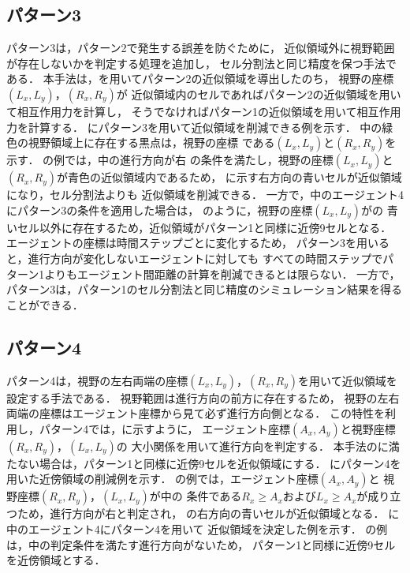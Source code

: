 \subsection{パターン3}
パターン3は，パターン2で発生する誤差を防ぐために，
近似領域外に視野範囲が存在しないかを判定する処理を追加し，
セル分割法と同じ精度を保つ手法である\cite{katayose}．
本手法は，を用いてパターン2の近似領域を導出したのち，
視野の座標$(L_x,L_y)$，$(R_x,R_y)$が
近似領域内のセルであればパターン2の近似領域を用いて相互作用力を計算し，
そうでなければパターン1の近似領域を用いて相互作用力を計算する．
にパターン3を用いて近似領域を削減できる例を示す．
中の緑色の視野領域上に存在する黒点は，視野の座標
である$(L_x,L_y)$と$(R_x,R_y)$を示す．
の例では，中の進行方向が右
の条件を満たし，視野の座標$(L_x,L_y)$と$(R_x,R_y)$が青色の近似領域内であるため，
に示す右方向の青いセルが近似領域になり，セル分割法よりも
近似領域を削減できる．
一方で，中のエージェント4にパターン3の条件を適用した場合は，
のように，視野の座標$(L_x,L_y)$がの
青いセル以外に存在するため，近似領域がパターン1と同様に近傍9セルとなる．
エージェントの座標は時間ステップごとに変化するため，
パターン3を用いると，進行方向が変化しないエージェントに対しても
すべての時間ステップでパターン1よりもエージェント間距離の計算を削減できるとは限らない．
一方で，パターン3は，パターン1のセル分割法と同じ精度のシミュレーション結果を得ることができる．



\subsection{パターン4}
パターン4は，視野の左右両端の座標$(L_x,L_y)$，$(R_x,R_y)$を用いて近似領域を設定する手法である．
視野範囲は進行方向の前方に存在するため，
視野の左右両端の座標はエージェント座標から見て必ず進行方向側となる．
この特性を利用し，パターン4では，に示すように，
エージェント座標$(A_x,A_y)$と視野座標$(R_x,R_y)$，$(L_x,L_y)$の
大小関係を用いて進行方向を判定する．
本手法のに満たない場合は，パターン1と同様に近傍9セルを近似領域にする．
にパターン4を用いた近傍領域の削減例を示す．
の例では，エージェント座標$(A_x,A_y)$と
視野座標$(R_x,R_y)$，$(L_x,L_y)$が中の
条件である$R_x \geq A_x$および$L_x \geq A_x$が成り立つため，進行方向が右と判定され，
の右方向の青いセルが近似領域となる．
に中のエージェント4にパターン4を用いて
近似領域を決定した例を示す．
の例は，中の判定条件を満たす進行方向がないため，
パターン1と同様に近傍9セルを近傍領域とする．


